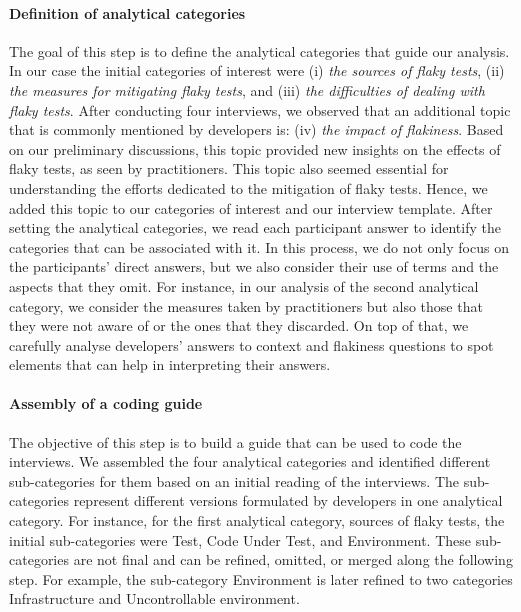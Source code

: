\paragraph{Definition of analytical categories}
The goal of this step is to define the analytical categories that guide our analysis.
In our case the initial categories of interest were (i) \textit{the sources of flaky tests}, (ii) \textit{the measures for mitigating flaky tests}, and (iii) \textit{the difficulties of dealing with flaky tests}.
After conducting four interviews, we observed that an additional topic that is commonly mentioned by developers is: (iv) \textit{the impact of flakiness}.
Based on our preliminary discussions, this topic provided new insights on the effects of flaky tests, as seen by practitioners.
This topic also seemed essential for understanding the efforts dedicated to the mitigation of flaky tests.
Hence, we added this topic to our categories of interest and our interview template.
After setting the analytical categories, we read each participant answer to identify the categories that can be associated with it.
In this process, we do not only focus on the participants' direct answers, but we also consider their use of terms and the aspects that they omit.
For instance, in our analysis of the second analytical category, we consider the measures taken by practitioners but also those that they were not aware of or the ones that they discarded.
On top of that, we carefully analyse developers' answers to context and flakiness questions to spot elements that can help in interpreting their answers.

\paragraph{Assembly of a coding guide}
The objective of this step is to build a guide that can be used to code the interviews.
We assembled the four analytical categories and identified different sub-categories for them based on an initial reading of the interviews.
The sub-categories represent different versions formulated by developers in one  analytical category.
For instance, for the first analytical category, \ie sources of flaky tests, the initial sub-categories were \textsf{Test}, \textsf{Code Under Test}, and \textsf{Environment}.
These sub-categories are not final and can be refined, omitted, or merged along the following step.
For example, the sub-category \textsf{Environment} is later refined to two categories \textsf{Infrastructure} and \textsf{Uncontrollable environment}.

